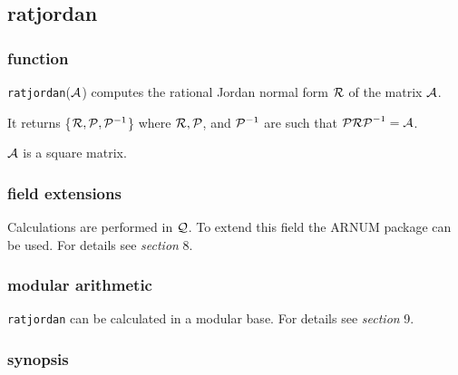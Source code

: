\subsection{ratjordan}

\subsubsection{function}

{\tt ratjordan}(${\cal A}$) computes the rational Jordan normal form 
${\cal R}$ of the matrix ${\cal A}$.

It returns \{${\cal R}, {\cal P}, {\cal P}^{-1}$\} where ${\cal R}, 
{\cal P}$, and ${\cal P}^{-1}$ are such that ${\cal P R P}^{-1} = 
{\cal A}$.

${\cal A}$ is a square matrix.

\subsubsection{field extensions}

Calculations are performed in ${\cal Q}$. To extend this field the 
{\small ARNUM} package can be used. For details see {\it section} 8.

\subsubsection{modular arithmetic}

{\tt ratjordan} can be calculated in a modular base. For details see 
{\it section} 9.

\subsubsection{synopsis}

